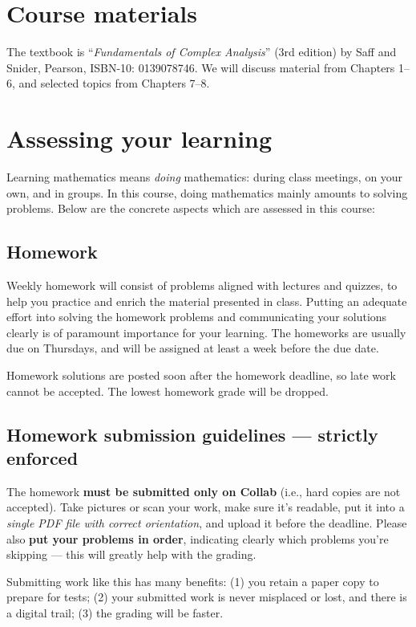\documentclass[oneside,11pt]{amsart}
\begin{document}
\section{Course materials}

The textbook is “\emph{Fundamentals of Complex Analysis}” (3rd edition)
by Saff and Snider, Pearson, ISBN-10: 0139078746.
We will discuss material from Chapters 1--6, and selected topics from Chapters 7--8.

\section{Assessing your learning}

Learning mathematics means \emph{doing} mathematics: during class meetings, on your own, and in groups. 
In this course, doing mathematics mainly amounts to solving problems. 
Below are the concrete aspects which are assessed in this course:

\subsection{Homework}

Weekly homework will consist of
problems aligned with lectures and quizzes,
to help you practice and enrich the material presented in class.
Putting an adequate effort into solving the homework
problems and
communicating your solutions clearly is
of paramount importance for your learning.
The homeworks are usually due on
Thursdays, and will be assigned at least a week before the due
date.

Homework solutions are posted soon after the
homework deadline, so late work cannot be accepted.
The lowest homework grade will be dropped.

\subsection*{Homework submission guidelines --- strictly enforced}
The homework \textbf{must be submitted only on Collab} (i.e., hard copies are not accepted).
Take pictures or scan your work,
make sure it's readable,
put it into a \emph{single PDF file with correct orientation},
and upload it before the deadline.
Please also \textbf{put your problems in order}, indicating clearly which problems you're skipping --- this will greatly help with the grading.

Submitting work like this has many benefits:
(1) you retain a paper copy to
prepare for tests;
(2) your submitted work is never misplaced or lost, and there is a digital trail;
(3) the grading will be faster.
\end{document}
